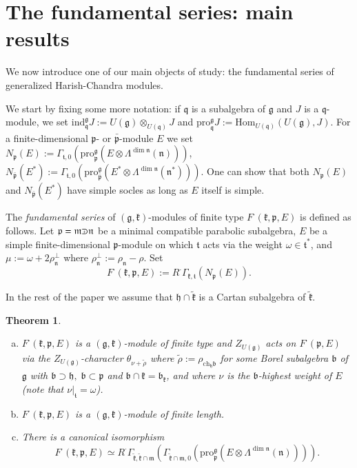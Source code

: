 \documentclass[10pt]{amsart}
\newtheorem{theo}{Theorem}[section]
\newcommand{\ch}{\mathrm{ch}}
\newcommand{\pro}{\mathrm{pro}}
\newcommand{\ind}{\mathrm{ind}}
\newcommand{\Hom}{\mathrm{Hom}}
\newcommand{\bb}{\mathfrak{b}}
\renewcommand{\gg}{\mathfrak{g}}
\newcommand{\hh}{\mathfrak{h}}
\newcommand{\kk}{\mathfrak{k}}
\newcommand{\mm}{\mathfrak{m}}
\newcommand{\nn}{\mathfrak{n}}
\newcommand{\pp}{\mathfrak{p}}
\newcommand{\qq}{\mathfrak{q}}
\renewcommand{\tt}{\mathfrak{t}}
\def\crplus{\hbox{$\supset${\raise1.05pt\hbox{\kern -0.55em ${\scriptscriptstyle +}$}}\ }}
\begin{document}
\section{The fundamental series: main results}\label{sect:2}

We now introduce one of our main objects of study: the fundamental series of generalized Harish-Chandra modules.

We start by fixing some more notation: if $\qq$ is a subalgebra of $\gg$ and $J$ is a $\qq$-module, we set $\ind^{\gg}_\qq J:=U(\gg)\otimes_{U(\qq)}J$ and $\pro_\qq^\gg J:=\Hom_{U(\qq)}(U(\gg),J)$. For a finite-dimensional $\pp$- or $\bar{\pp}$-module $E$ we set $N_\pp(E):=\Gamma_{\tt,0}(\pro_\pp^\gg(E\otimes\Lambda^{\dim \nn}(\nn)))$, $N_{\bar{\pp}}(E^*):=\Gamma_{\tt,0}(\pro_{\bar{\pp}}^\gg(E^*\otimes\Lambda^{\dim \nn}(\nn^*)))$. One can show that both $N_\pp(E)$ and $N_{\bar{\pp}}(E^*)$ have simple socles as long as $E$ itself is simple.

The \textit{fundamental series} of $(\gg,\kk)$-modules of finite type $F^\cdot(\kk,\pp,E)$ is defined as follows. Let $\pp=\mm\crplus\nn$ be a minimal compatible parabolic subalgebra, $E$ be a simple finite-dimensional $\pp$-module on which $\tt$ acts via the weight $\omega\in\tt^*$, and $\mu:=\omega+2\rho_\nn^\perp$ where $\rho_\nn^\perp :=\rho_\nn -\rho$. Set $$F^\cdot(\kk,\pp,E):=R^\cdot\Gamma_{\kk,\tt}(N_\pp(E)).$$ 

In the rest of the paper we assume that $\hh \cap \tilde{\kk}$ is a Cartan subalgebra of $\tilde{\kk}$.

\begin{theo}\label{th:3}
    \begin{enumerate}[a)]
		\item $F^\cdot(\kk,\pp,E)$ is a $(\gg,\kk)$-module of finite type and $Z_{U(\gg)}$ acts on $F^\cdot(\pp,E)$ via the $Z_{U(\gg)}$-character $\theta_{\nu+\tilde{\rho}}$ where $\tilde{\rho}:=\rho_{\ch_\hh\bb}$ for some Borel subalgebra $\bb$ of $\gg$ with $\bb\supset\hh,\;\bb\subset\pp$ and $\bb\cap\kk=\bb_\kk$, and where $\nu$ is the $\bb$-highest weight of $E$ (note that $\nu|_\tt=\omega$).
		\item $F^\cdot(\kk,\pp,E)$ is a $(\gg,\kk)$-module of finite length.
		\item There is a canonical isomorphism
		\begin{equation}\label{eq1}
		    F^\cdot(\kk,\pp,E)\simeq R^\cdot\Gamma_{\tilde{\kk},\tilde{\kk}\cap\mm}(\Gamma_{\tilde{\kk}\cap\mm,0}(\pro_\pp^\gg (E\otimes \Lambda^{\dim \nn}(\nn)))).
		\end{equation}
    \end{enumerate}
\end{theo}
\end{document}
